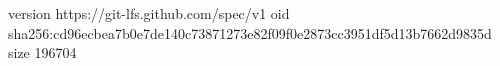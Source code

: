 version https://git-lfs.github.com/spec/v1
oid sha256:cd96ecbea7b0e7de140c73871273e82f09f0e2873cc3951df5d13b7662d9835d
size 196704

